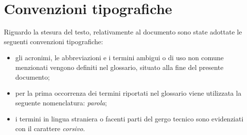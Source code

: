 
\cleardoublepage
{}
\thispagestyle{empty}

\vspace*{3cm}

\chapter*{Convenzioni tipografiche}

Riguardo la stesura del testo, relativamente al documento sono state adottate le seguenti convenzioni tipografiche:
\begin{itemize}
	\item gli acronimi, le abbreviazioni e i termini ambigui o di uso non comune menzionati vengono definiti nel glossario, situato alla fine del presente documento;
	\item per la prima occorrenza dei termini riportati nel glossario viene utilizzata la seguente nomenclatura: \emph{parola}\glsfirstoccur;
	\item i termini in lingua straniera o facenti parti del gergo tecnico sono evidenziati con il carattere \emph{corsivo}.
\end{itemize}